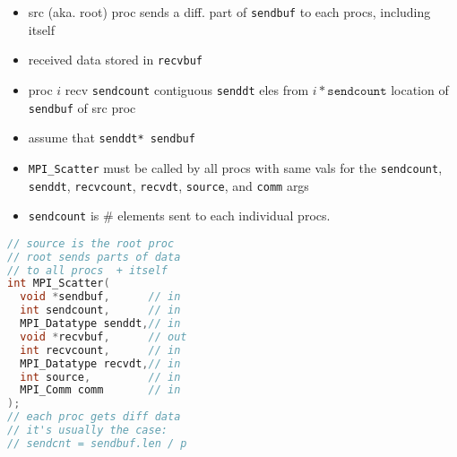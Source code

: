\documentclass[8pt,a4paper,landscape]{extarticle}
\begin{document}
\pagestyle{empty}

\begin{multicols*}{3}
% 
% 
% 
% 
% 
% 
% 

% 
\begin{minipage}{0.5\linewidth}
  \flushleft
  \begin{itemize}
  \item src (aka. root) proc sends a diff. part of \texttt{sendbuf} to each procs, including itself
  \item received data stored in \texttt{recvbuf}
  \item proc $i$ recv \texttt{sendcount} contiguous \texttt{senddt} eles from $i*\texttt{sendcount}$ location of \texttt{sendbuf} of src proc
  \item assume that \texttt{senddt* sendbuf}
  \item \texttt{MPI\_Scatter} must be called by all procs with same vals for the \texttt{sendcount}, \texttt{senddt}, \texttt{recvcount}, \texttt{recvdt}, \texttt{source}, and \texttt{comm} args
  \item \texttt{sendcount} is $\#$ elements sent to each individual procs.
  \end{itemize}
\end{minipage}
\begin{minipage}{0.5\linewidth}
\begin{lstlisting}[language=c,xleftmargin=1pt]
// source is the root proc
// root sends parts of data
// to all procs  + itself
int MPI_Scatter(
  void *sendbuf,      // in
  int sendcount,      // in
  MPI_Datatype senddt,// in
  void *recvbuf,      // out
  int recvcount,      // in
  MPI_Datatype recvdt,// in
  int source,         // in
  MPI_Comm comm       // in
);
// each proc gets diff data
// it's usually the case:
// sendcnt = sendbuf.len / p
\end{lstlisting}
\end{minipage}


\end{multicols*}
\end{document}
